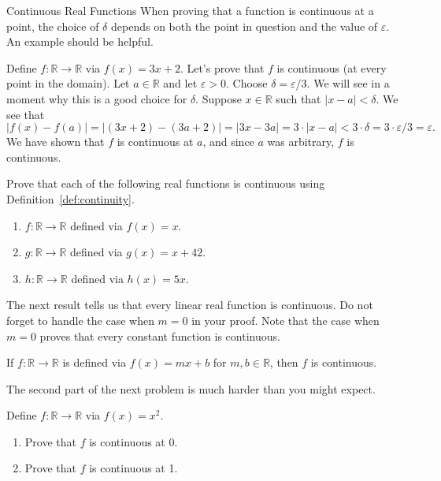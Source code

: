 \begin{section}{Continuous Real Functions}
When proving that a function is continuous at a point, the choice of $\delta$ depends on both the point in question and the value of $\varepsilon$. An example should be helpful.

\begin{example}
Define $f:\mathbb{R}\to\mathbb{R}$ via $f(x)=3x+2$. Let's prove that $f$ is continuous (at every point in the domain). Let $a\in\mathbb{R}$ and let $\varepsilon>0$. Choose $\delta=\varepsilon/3$.  We will see in a moment why this is a good choice for $\delta$.  Suppose $x\in\mathbb{R}$ such that $|x-a|<\delta$. We see that
\[
|f(x)-f(a)|=|(3x+2)-(3a+2)|=|3x-3a| = 3\cdot |x-a|<3\cdot \delta = 3\cdot \varepsilon/3 =\varepsilon.
\]
We have shown that $f$ is continuous at $a$, and since $a$ was arbitrary, $f$ is continuous.
\end{example}

\begin{problem}
Prove that each of the following real functions is continuous using Definition~\ref{def:continuity}.
\begin{enumerate}[label=\textrm{(\alph*)}]
\item $f:\mathbb{R}\to \mathbb{R}$ defined via $f(x)=x$.
\item $g:\mathbb{R}\to \mathbb{R}$ defined via $g(x)=x+42$.
\item $h:\mathbb{R}\to \mathbb{R}$ defined via $h(x)=5x$.
\end{enumerate}
\end{problem}

The next result tells us that every linear real function is continuous. Do not forget to handle the case when $m=0$ in your proof. Note that the case when $m=0$ proves that every constant function is continuous.

\begin{theorem}
If $f:\mathbb{R}\to\mathbb{R}$ is defined via $f(x)=mx+b$ for $m,b\in\mathbb{R}$, then $f$ is continuous.
\end{theorem}

The second part of the next problem is much harder than you might expect.

\begin{problem}
Define $f:\mathbb{R}\to\mathbb{R}$ via $f(x)=x^2$. 
\begin{enumerate}[label=\textrm{(\alph*)}]
\item Prove that $f$ is continuous at 0.
\item Prove that $f$ is continuous at 1.
\end{enumerate}
\end{problem}


\end{section}
